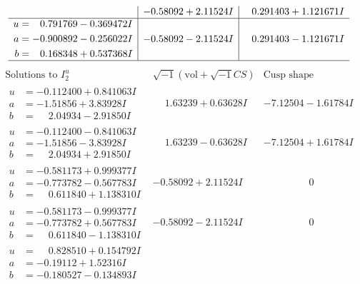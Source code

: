 \documentclass[1p]{elsarticle_modified}
\theoremstyle{definition}
\newcommand{\I}{\sqrt{-1}}
\begin{document}
$$\begin{array}{c|c|c}
 & -0.58092 + 2.11524 I & \phantom{-}0.291403 + 1.121671 I \\ \hline\begin{aligned}
u &= \phantom{-}0.791769 - 0.369472 I \\
a &= -0.900892 - 0.256022 I \\
b &= \phantom{-}0.168348 + 0.537368 I\end{aligned}
 & -0.58092 - 2.11524 I & \phantom{-}0.291403 - 1.121671 I\\
 \hline 
 \end{array}$$\newpage$$\begin{array}{c|c|c}  
\text{Solutions to }I^u_{2}& \I (\text{vol} + \sqrt{-1}CS) & \text{Cusp shape}\\
 \hline 
\begin{aligned}
u &= -0.112400 + 0.841063 I \\
a &= -1.51856 + 3.83928 I \\
b &= \phantom{-}2.04934 - 2.91850 I\end{aligned}
 & \phantom{-}1.63239 + 0.63628 I & -7.12504 - 1.61784 I \\ \hline\begin{aligned}
u &= -0.112400 - 0.841063 I \\
a &= -1.51856 - 3.83928 I \\
b &= \phantom{-}2.04934 + 2.91850 I\end{aligned}
 & \phantom{-}1.63239 - 0.63628 I & -7.12504 + 1.61784 I \\ \hline\begin{aligned}
u &= -0.581173 + 0.999377 I \\
a &= -0.773782 - 0.567783 I \\
b &= \phantom{-}0.611840 + 1.138310 I\end{aligned}
 & -0.58092 + 2.11524 I & \phantom{-0.000000 } 0 \\ \hline\begin{aligned}
u &= -0.581173 - 0.999377 I \\
a &= -0.773782 + 0.567783 I \\
b &= \phantom{-}0.611840 - 1.138310 I\end{aligned}
 & -0.58092 - 2.11524 I & \phantom{-0.000000 } 0 \\ \hline\begin{aligned}
u &= \phantom{-}0.828510 + 0.154792 I \\
a &= -0.19112 + 1.52316 I \\
b &= -0.180527 - 0.134893 I\end{aligned}

\end{array}$$
\end{document}
